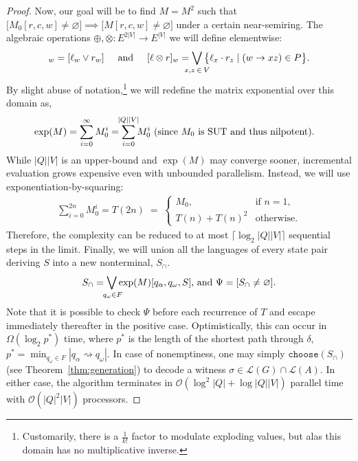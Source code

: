 \documentclass[sigplan,review,acmsmall,nonacm,screen,anonymous]{acmart}\settopmatter{printfolios=false,printccs=false,printacmref=false}
\begin{document}
\begin{proof}[Proof]
  Now, our goal will be to find $M=M^2$ such that $\big[M_0[r, c, w] \neq \varnothing\big] \implies \big[M[r, c, w] \neq \varnothing\big]$ under a certain near-semiring. The algebraic operations $\oplus, \otimes: E^{2|V|} \rightarrow E^{|V|}$ we will define elementwise:
  \begin{equation}
    [\ell \oplus r]_w  = [\ell_w \lor r_w]\hspace{0.5cm}\text{and}\hspace{0.5cm}
    [\ell \otimes r]_w = \bigvee_{\mathclap{x, z\:\in\:V}}\big\{\ell_x \cdot r_z \mid (w \rightarrow xz) \in P\big\}.
  \end{equation}
  By slight abuse of notation,\footnote{Customarily, there is a $\frac{1}{k!}$ factor to modulate exploding values, but alas this domain has no multiplicative inverse.} we will redefine the matrix exponential over this domain as,
  \begin{align}
    \exp(M) &= \sum_{i = 0}^\infty M_0^i = \sum_{i = 0}^{\mathclap{|Q||V|}} M_0^i \text { (since $M_0$ is SUT and thus nilpotent).}
  \end{align}
  While $|Q||V|$ is an upper-bound and $\exp(M)$ may converge sooner, incremental evaluation grows expensive even with unbounded parallelism. Instead, we will use exponentiation-by-squaring:
  \begin{align}
    \sum_{i = 0}^{2n} M_0^i = T(2n) \;=\; \begin{cases}
       M_0, & \text{if } n = 1,\\
       T(n) + T(n)^2 & \text{otherwise}.
    \end{cases}
  \end{align}
  Therefore, the complexity can be reduced to at most $\lceil\log_2 |Q||V|\rceil$ sequential steps in the limit. Finally, we will union all the languages of every state pair deriving $S$ into a new nonterminal, $S_\cap$.
  \begin{align}
    S_\cap = \bigvee_{\mathclap{\:q_\omega \in F}}\exp(M)[q_\alpha, q_\omega, S] \text{, and } \Psi = [S_\cap \neq \varnothing].
  \end{align}
  Note that it is possible to check $\Psi$ before each recurrence of $T$ and escape immediately thereafter in the positive case. Optimistically, this can occur in $\Omega(\log_2 p^*)$ time, where $p^*$ is the length of the shortest path through $\delta$, $p^*=\min_{q_\omega \in F}|q_\alpha\rightsquigarrow q_\omega|$. In case of nonemptiness, one may simply $\texttt{choose}(S_\cap)$ (see Theorem~\ref{thm:generation}) to decode a witness $\sigma \in \mathcal{L}(G)\cap\mathcal{L}(A)$. In either case, the algorithm terminates in $\mathcal{O}(\log^2 |Q| + \log |Q||V|)$ parallel time with $\mathcal{O}(|Q|^2|V|)$ processors.
\end{proof}\clearpage
\end{document}
